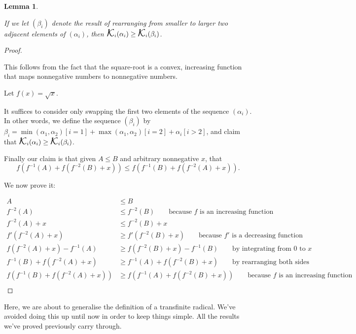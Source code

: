 \documentclass[
]{article}
\DeclareMathOperator*{\kap}{\text{\Large{$\mathcal K$}}}
\theoremstyle{theorem}
\theoremstyle{lemma}
\newtheorem{lemma}{Lemma}
\theoremstyle{corollary}
\theoremstyle{remark}
\theoremstyle{definition}
\begin{document}
\begin{lemma}
\hypertarget{lemma-10}{%
\label{lemma-10}}


If we let \((\beta_i)\) denote the result of rearranging from smaller to larger two adjacent elements of \((\alpha_i)\), then \(\kap_i(\alpha_i) \geq \kap_i(\beta_i)\).

\end{lemma}
\begin{proof}

\hypertarget{proof-13}{%
\label{proof-13}}
This follows from the fact that the square-root is a convex, increasing function that maps nonnegative numbers to nonnegative numbers.

Let \(f(x) = \sqrt{x}\).

It suffices to consider only swapping the first two elements of the sequence \((\alpha_i)\). In other words, we define the sequence \((\beta_i)\) by \(\beta_i = \min(\alpha_1,\alpha_2)[i = 1] + \max(\alpha_1,\alpha_2)[i=2] + \alpha_i[i>2]\), and claim that \(\kap_i(\alpha_i) \geq \kap_i(\beta_i)\).

Finally our claim is that given \(A \leq B\) and arbitrary nonnegative \(x\), that \[f(f^{-1}(A) + f(f^{-2}(B) + x)) \leq f(f^{-1}(B) + f(f^{-2}(A) + x)).\]

We now prove it:

\[\begin{aligned}
A &\leq B\\
f^{-2}(A) &\leq f^{-2}(B) \qquad{\text{because $f$ is an increasing function}}\\
f^{-2}(A) + x&\leq f^{-2}(B) + x\\
f'(f^{-2}(A) + x)&\geq f'(f^{-2}(B) + x) \qquad{\text{because $f'$ is a decreasing function}}\\
f(f^{-2}(A) + x) - f^{-1}(A) &\geq f(f^{-2}(B) + x) - f^{-1}(B)\qquad{\text{by integrating from $0$ to $x$}}\\
f^{-1}(B) + f(f^{-2}(A) + x) &\geq f^{-1}(A) + f(f^{-2}(B) + x) \qquad{\text{by rearranging both sides}}\\
f(f^{-1}(B) + f(f^{-2}(A) + x)) &\geq f(f^{-1}(A) + f(f^{-2}(B) + x)) \qquad{\text{because $f$ is an increasing function}}\\
\end{aligned}\]

\end{proof}
Here, we are about to generalise the definition of a transfinite radical. We've avoided doing this up until now in order to keep things simple. All the results we've proved previously carry through.
\end{document}
